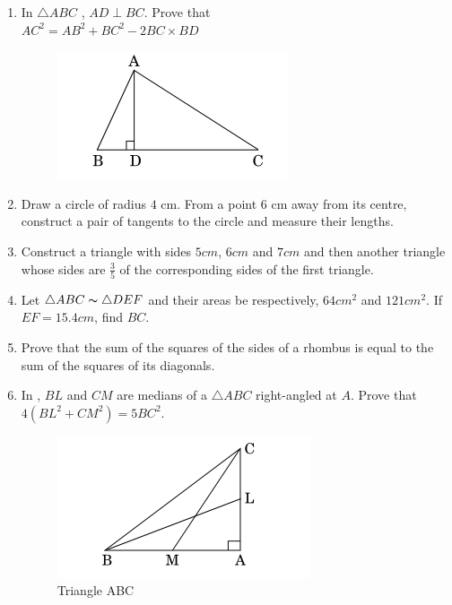 \begin{enumerate}
\item In $\triangle ABC$ , $AD \perp BC$. Prove that\\
$AC^2 = AB^2 + BC^2 - 2BC \times BD $
\begin{figure}[H]
    \centering
    \includegraphics[width=\columnwidth]{figs/cons2.png}
    \caption{}
    \label{fig:Fig_2}
\end{figure}

\item Draw a circle of radius $4$ cm. From a point $6$ cm away from its centre, construct a pair of tangents to the circle and measure their lengths.

\item Construct a triangle with sides $5cm$, $6cm$ and $7cm$ and then another triangle whose sides are $\frac{3}{5}$ of the corresponding sides of the first triangle.

\item Let $\triangle ABC  \thicksim  \triangle DEF$  and their areas be respectively, $64cm^2$ and $121cm^2$. If $EF=15.4cm$, find $BC$.

\item Prove that the sum of the squares of the sides of a rhombus is equal to the sum of the squares of its diagonals. 

\item In , $BL$ and $CM$ are medians of a $\triangle ABC$ right-angled at $A$. Prove that $4(BL^2 + CM^2)= 5 BC^2$. 
\begin{figure}[H]
    \centering
    \includegraphics[width=\columnwidth]{figs/cons1.png}
    \caption{Triangle ABC}
    \label{fig:Fig_3}
\end{figure}


\end{enumerate}

